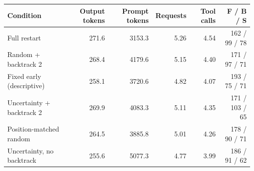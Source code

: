 \begin{tabular}{@{}lrrrrr@{}}
\toprule
Condition & Output tokens & Prompt tokens & Requests & Tool calls & F / B / S \\
\midrule
Full restart & 271.6 & 3153.3 & 5.26 & 4.54 & 162 / 99 / 78 \\
Random + backtrack 2 & 268.4 & 4179.6 & 5.15 & 4.40 & 171 / 97 / 71 \\
Fixed early (descriptive) & 258.1 & 3720.6 & 4.82 & 4.07 & 193 / 75 / 71 \\
Uncertainty + backtrack 2 & 269.9 & 4083.3 & 5.11 & 4.35 & 171 / 103 / 65 \\
Position-matched random & 264.5 & 3885.8 & 5.01 & 4.26 & 178 / 90 / 71 \\
Uncertainty, no backtrack & 255.6 & 5077.3 & 4.77 & 3.99 & 186 / 91 / 62 \\
\bottomrule
\end{tabular}
